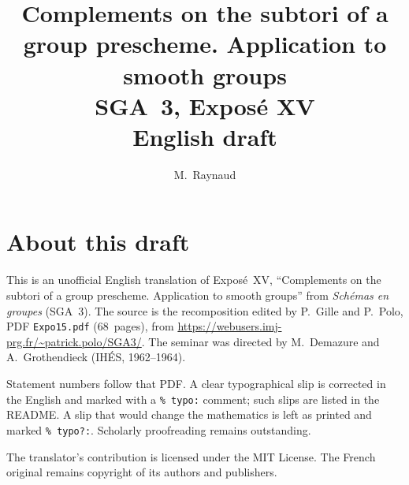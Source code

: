 \documentclass[11pt,a4paper,oneside]{amsbook}
\title[SGA~3, Expos\'e XV (English draft)]{Complements on the subtori of a group prescheme. Application to smooth groups\\
{\normalsize SGA~3, Expos\'e XV\\English draft}}
\author{M.\ Raynaud}
\date{}
\begin{document}
\frontmatter
\maketitle

\chapter*{About this draft}
This is an unofficial English translation of Expos\'e~XV, ``Complements on the subtori of a group prescheme. Application to smooth groups''
from \textit{Sch\'emas en groupes} (SGA~3).
The source is the recomposition edited by P.~Gille and P.~Polo,
PDF \texttt{Expo15.pdf} (68~pages),
from \url{https://webusers.imj-prg.fr/~patrick.polo/SGA3/}.
The seminar was directed by M.~Demazure and A.~Grothendieck
(IH\'ES, 1962--1964).

Statement numbers follow that PDF. A clear typographical slip is
corrected in the English and marked with a \texttt{\% typo:} comment;
such slips are listed in the README. A slip that would change the
mathematics is left as printed and marked \texttt{\% typo?:}.
Scholarly proofreading remains outstanding.

The translator's contribution is licensed under the MIT License.
The French original remains copyright of its authors and publishers.

\tableofcontents
\mainmatter












\end{document}

